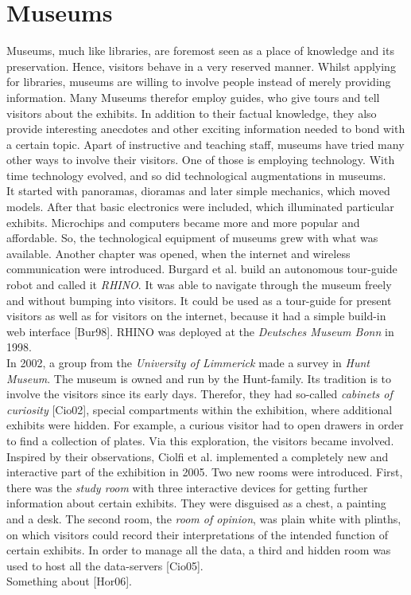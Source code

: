 \section{Museums}
\label{motivation_museums}

Museums, much like libraries, are foremost seen as a place of knowledge and its preservation. Hence, visitors behave in a very reserved manner. Whilst applying for libraries, museums are willing to involve people instead of merely providing information. Many Museums therefor employ guides, who give tours and tell visitors about the exhibits. In addition to their factual knowledge, they also provide interesting anecdotes and other exciting information needed to bond with a certain topic. Apart of instructive and teaching staff, museums have tried many other ways to involve their visitors. One of those is employing technology. With time technology evolved, and so did technological augmentations in museums.
\\
It started with panoramas, dioramas and later simple mechanics, which moved models. After that basic electronics were included, which illuminated particular exhibits. Microchips and computers became more and more popular and affordable. So, the technological equipment of museums grew with what was available. Another chapter was opened, when the internet and wireless communication were introduced. Burgard et al. build an autonomous tour-guide robot and  called it \textit{RHINO}. It was able to navigate through the museum freely and without bumping into visitors. It could be used as a tour-guide for present visitors as well as for visitors on the internet, because it had a simple build-in web interface [Bur98]. RHINO was deployed at the \textit{Deutsches Museum Bonn} in 1998.
\\
In 2002, a group from the \textit{University of Limmerick} made a survey in \textit{Hunt Museum}. The museum is owned and run by the Hunt-family. Its tradition is to involve the visitors since its early days. Therefor, they had so-called \textit{cabinets of curiosity} [Cio02], special compartments within the exhibition, where additional exhibits were hidden. For example, a curious visitor had to open drawers in order to find a collection of plates. Via this exploration, the visitors became involved. Inspired by their observations, Ciolfi et al. implemented a completely new and interactive part of the exhibition in 2005. Two new rooms were introduced. First, there was the \textit{study room} with three interactive devices for getting further information about certain exhibits. They were disguised as a chest, a painting and a desk. The second room, the \textit{room of opinion}, was plain white with plinths, on which visitors could record their interpretations of the intended function of certain exhibits. In  order to manage all the data, a third and hidden room was used to host all the data-servers [Cio05].
\\
Something about [Hor06].

